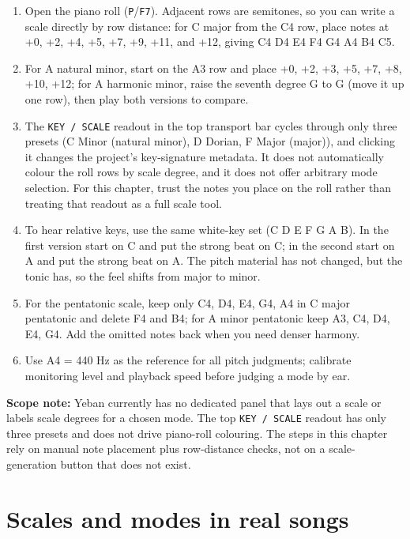 \begin{enumerate}
  \item Open the piano roll (\texttt{P}/\texttt{F7}). Adjacent rows are semitones, so you can write a scale directly by row distance: for C major from the C4 row, place notes at +0, +2, +4, +5, +7, +9, +11, and +12, giving C4 D4 E4 F4 G4 A4 B4 C5.
  \item For A natural minor, start on the A3 row and place +0, +2, +3, +5, +7, +8, +10, +12; for A harmonic minor, raise the seventh degree G to G\sharpsym{} (move it up one row), then play both versions to compare.
  \item The \texttt{KEY / SCALE} readout in the top transport bar cycles through only three presets (C Minor (natural minor), D Dorian, F Major (major)), and clicking it changes the project's key-signature metadata. It does not automatically colour the roll rows by scale degree, and it does not offer arbitrary mode selection. For this chapter, trust the notes you place on the roll rather than treating that readout as a full scale tool.
  \item To hear relative keys, use the same white-key set (C D E F G A B). In the first version start on C and put the strong beat on C; in the second start on A and put the strong beat on A. The pitch material has not changed, but the tonic has, so the feel shifts from major to minor.
  \item For the pentatonic scale, keep only C4, D4, E4, G4, A4 in C major pentatonic and delete F4 and B4; for A minor pentatonic keep A3, C4, D4, E4, G4. Add the omitted notes back when you need denser harmony.
  \item Use A4 = 440 Hz as the reference for all pitch judgments; calibrate monitoring level and playback speed before judging a mode by ear.
\end{enumerate}


\textbf{Scope note:} Yeban currently has no dedicated panel that lays out a scale or labels scale degrees for a chosen mode. The top \texttt{KEY / SCALE} readout has only three presets and does not drive piano-roll colouring. The steps in this chapter rely on manual note placement plus row-distance checks, not on a scale-generation button that does not exist.

\section{Scales and modes in real songs}

